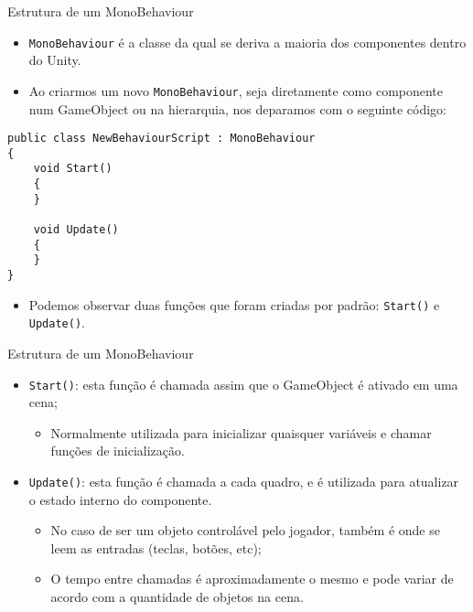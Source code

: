 \documentclass{beamer}
\begin{document}
\begin{frame}[fragile]{Estrutura de um MonoBehaviour}
	\begin{itemize}
		\item \verb|MonoBehaviour| é a classe da qual se deriva a maioria dos componentes dentro do Unity.
		\item Ao criarmos um novo \verb|MonoBehaviour|, seja diretamente como componente num GameObject ou na hierarquia, nos deparamos com o seguinte código:		
	\end{itemize}
	\begin{lstlisting}
public class NewBehaviourScript : MonoBehaviour
{
	void Start()
	{
	}
	
	void Update()
	{	
	}
}	
	\end{lstlisting}
	\begin{itemize}
		\item Podemos observar duas funções que foram criadas por padrão: \verb|Start()| e \verb|Update()|.
	\end{itemize}
\end{frame}

\begin{frame}[fragile]{Estrutura de um MonoBehaviour}
	\begin{itemize}
		\item \verb|Start()|: esta função é chamada assim que o GameObject é ativado em uma cena;
		\begin{itemize}
			\item Normalmente utilizada para inicializar quaisquer variáveis e chamar funções de inicialização.
		\end{itemize}
		\item \verb|Update()|: esta função é chamada a cada quadro, e é utilizada para atualizar o estado interno do componente. 
		\begin{itemize}
			\item No caso de ser um objeto controlável pelo jogador, também é onde se leem as entradas (teclas, botões, etc);
			\item O tempo entre chamadas é aproximadamente o mesmo e pode variar de acordo com a quantidade de objetos na cena.
		\end{itemize}
	\end{itemize}
\end{frame}
\end{document}
